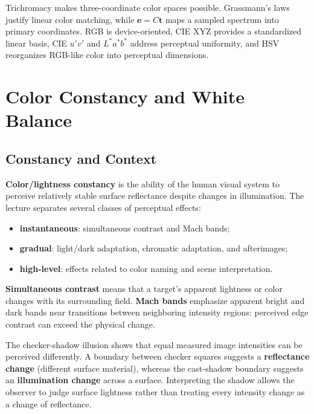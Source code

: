 \documentclass[11pt,a4paper,oneside]{report}
\begin{document}
\FloatBarrier
\begin{chaptersummary}
Trichromacy makes three-coordinate color spaces possible. Grassmann's laws justify linear color matching, while $\mathbf e=C\mathbf t$ maps a sampled spectrum into primary coordinates. RGB is device-oriented, CIE XYZ provides a standardized linear basis, CIE $u'v'$ and $L^*a^*b^*$ address perceptual uniformity, and HSV reorganizes RGB-like color into perceptual dimensions.
\end{chaptersummary}

\chapter{Color Constancy and White Balance}

\section{Constancy and Context}

\textbf{Color/lightness constancy} is the ability of the human visual system to perceive relatively stable surface reflectance despite changes in illumination. The lecture separates several classes of perceptual effects:
\begin{itemize}
  \item \textbf{instantaneous}: simultaneous contrast and Mach bands;
  \item \textbf{gradual}: light/dark adaptation, chromatic adaptation, and afterimages;
  \item \textbf{high-level}: effects related to color naming and scene interpretation.
\end{itemize}

\textbf{Simultaneous contrast} means that a target's apparent lightness or color changes with its surrounding field. \textbf{Mach bands} emphasize apparent bright and dark bands near transitions between neighboring intensity regions: perceived edge contrast can exceed the physical change.



The checker-shadow illusion shows that equal measured image intensities can be perceived differently. A boundary between checker squares suggests a \textbf{reflectance change} (different surface material), whereas the cast-shadow boundary suggests an \textbf{illumination change} across a surface. Interpreting the shadow allows the observer to judge surface lightness rather than treating every intensity change as a change of reflectance.
\end{document}
